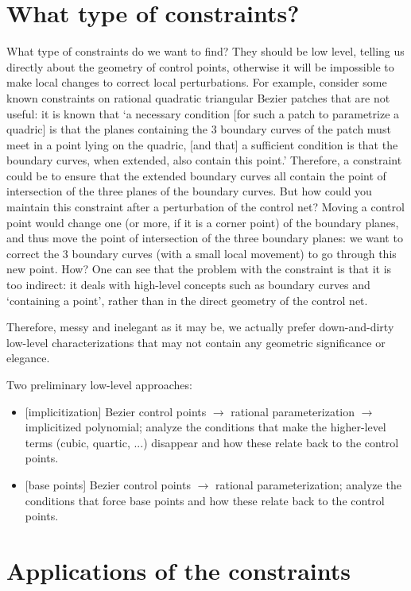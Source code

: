 \section{What type of constraints?}

What type of constraints do we want to find?
They should be low level, telling us directly about the geometry of
control points, otherwise it will be impossible to make
local changes to correct local perturbations.
For example, consider some known constraints on rational quadratic
triangular Bezier patches that are not useful:
it is known that `a necessary condition [for such a patch to parametrize
a quadric] is that the planes containing the 3 boundary curves of
the patch must meet in a point lying on the quadric, [and that]
a sufficient condition is that the boundary curves, when extended,
also contain this point.' \cite{Teller91}
Therefore, a constraint could be to ensure that the extended boundary
curves all contain the point of intersection of the three planes
of the boundary curves.
But how could you maintain this constraint after a perturbation
of the control net?
Moving a control point would change one (or more, if it is a corner
point) of the boundary planes, and thus move the point of intersection
of the three boundary planes: we want to correct the 3 boundary curves
(with a small local movement) to go through this new point.
How?
One can see that the problem with the constraint is that it is too
indirect: it deals with high-level concepts such as boundary curves 
and `containing a point', rather than in the direct geometry of
the control net.

Therefore, messy and inelegant as it may be,
we actually prefer down-and-dirty low-level characterizations
that may not contain any geometric significance or elegance.

Two preliminary low-level approaches:
\begin{itemize}
\item
	{[implicitization]}
	Bezier control points $\rightarrow$
	rational parameterization $\rightarrow$
	implicitized polynomial;
	analyze the conditions that make the higher-level terms
	(cubic, quartic, ...) disappear and how these relate back
	to the control points.
\item
	{[base points]}
	Bezier control points $\rightarrow$
	rational parameterization;
	analyze the conditions that force base points and
	how these relate back to the control points.
\end{itemize}

\section{Applications of the constraints}

